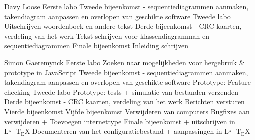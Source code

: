 \documentclass[a4paper,oneside]{report}
\def\latex{$\mathrm{L\!\!^{{}_{\scriptstyle A}} \!\!\!\!\!\;\; T\!_{\displaystyle E} \!
X}$}
\begin{document}
\begin{studentlog}{Davy Loose}
{Eerste labo}
{Tweede bijeenkomst - sequentiediagrammen aanmaken, takendiagram aanpassen en overlopen van geschikte software}
{Tweede labo}
{Uitschrijven woordenboek en andere tekst}
{Derde bijeenkomst - CRC kaarten, verdeling van het werk}
{Tekst schrijven voor klassendiagramman en sequentiediagrammen}
{Finale bijeenkomst}
{Inleiding schrijven}
\end{studentlog}

\begin{studentlog}{Simon Gaeremynck}
{Eerste labo}
{Zoeken naar mogelijkheden voor hergebruik \& prototype in JavaScript}
{Tweede bijeenkomst - sequentiediagrammen aanmaken, takendiagram aanpassen en overlopen van geschikte software}
{Prototype: Feature checking}
{Tweede labo}
{Prototype: tests + simulatie van bestanden verzenden}
{Derde bijeenkomst - CRC kaarten, verdeling van het werk}
{Berichten versturen}
{Vierde bijeenkomst}
{Vijfde bijeenkomst}
{Verwijderen van computers}
{Bugfixes aan verwijderen + Toevoegen internettype}
{Finale bijeenkomst + uitschrijven in \latex}
{Documenteren van het configuratiebestand + aanpassingen in \latex}
\end{studentlog}
\end{document}
